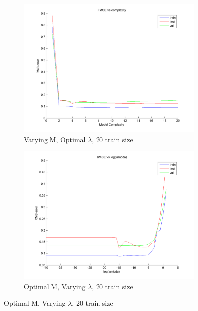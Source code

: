 \documentclass{article}
\begin{document}
\begin{figure}[H]

\begin{subfigure}{.5\textwidth}
\centering
\includegraphics[width=\linewidth]{RMS_complexity_20}
\caption{Varying M, Optimal $\lambda$, 20 train size}
\end{subfigure}
\begin{subfigure}{.5\textwidth}
\includegraphics[width=\linewidth]{RMS_lambda_20}
\caption{Optimal M, Varying $\lambda$, 20 train size}
\end{subfigure}



\end{figure}
\end{document}
